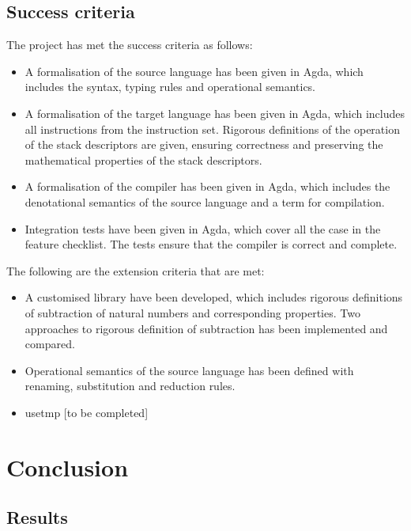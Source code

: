 \documentclass[12pt,twoside,a4paper]{report}
\theoremstyle{definition}
\theoremstyle{definition}
\theoremstyle{definition}
\theoremstyle{definition}
\begin{document}
    \section{Success criteria}
    The project has met the success criteria as follows:
    \begin{itemize}
        \item
            A formalisation of the source language has been given in Agda, which includes the syntax, typing rules and operational semantics. 

        \item
            A formalisation of the target language has been given in Agda, which includes all instructions from the instruction set. Rigorous definitions of the operation of the stack descriptors are given, ensuring correctness and preserving the mathematical properties of the stack descriptors.
        
        \item
            A formalisation of the compiler has been given in Agda, which includes the denotational semantics of the source language and a term for compilation.

        \item 
            Integration tests have been given in Agda, which cover all the case in the feature checklist. The tests ensure that the compiler is correct and complete.
    \end{itemize}

    The following are the extension criteria that are met:
    \begin{itemize}
        \item 
            A customised library have been developed, which includes rigorous definitions of subtraction of natural numbers and corresponding properties. Two approaches to rigorous definition of subtraction has been implemented and compared.
        \item
            Operational semantics of the source language has been defined with renaming, substitution and reduction rules.
        \item
            usetmp [to be completed]

    \end{itemize}

\chapter{Conclusion}
    \minitoc
    \section{Results}
\end{document}
